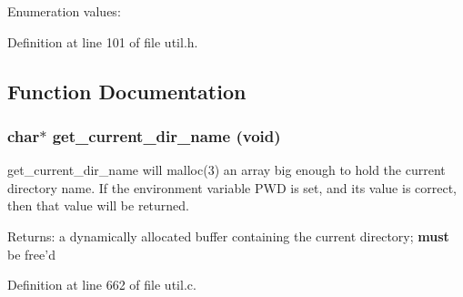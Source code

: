 \begin{Desc}
\item[Enumeration values: ]\par
\begin{description}
\item[{\em 
LUTIL\_\-BASE\_\-ERROR\_\-ABORTED\label{util_8h_a33a7}
}]\item[{\em 
LUTIL\_\-BASE\_\-ERROR\_\-FAILED\label{util_8h_a33a8}
}]\item[{\em 
LUTIL\_\-BASE\_\-ERROR\_\-INVALID\_\-ARG\label{util_8h_a33a9}
}]\end{description}
\end{Desc}



Definition at line 101 of file util.h.

\subsection{Function Documentation}
\subsubsection{\setlength{\rightskip}{0pt plus 5cm}char$\ast$ get\_\-current\_\-dir\_\-name (void)}\label{util_8h_a32}


get\_\-current\_\-dir\_\-name will malloc(3) an array big enough to hold the current directory name. If the environment variable PWD is set, and its value is correct, then that value will be returned.

\begin{Desc}
\item[Returns:]a dynamically allocated buffer containing the current directory; {\bf must} be free'd \end{Desc}


Definition at line 662 of file util.c.
